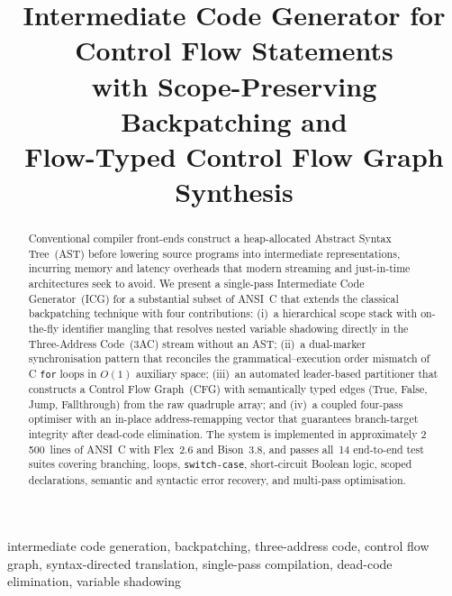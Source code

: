 \documentclass[conference]{IEEEtran}
\begin{document}
\title{Intermediate Code Generator for Control Flow Statements\\with Scope-Preserving Backpatching and\\Flow-Typed Control Flow Graph Synthesis}

\author{
\and
{}
\and
{}
}

\maketitle

\begin{abstract}
Conventional compiler front-ends construct a heap-allocated Abstract Syntax Tree~(AST) before lowering source programs into intermediate representations, incurring memory and latency overheads that modern streaming and just-in-time architectures seek to avoid. We present a single-pass Intermediate Code Generator~(ICG) for a substantial subset of ANSI~C that extends the classical backpatching technique with four contributions: (i)~a hierarchical scope stack with on-the-fly identifier mangling that resolves nested variable shadowing directly in the Three-Address Code~(3AC) stream without an AST; (ii)~a dual-marker synchronisation pattern that reconciles the grammatical--execution order mismatch of C \texttt{for} loops in $O(1)$ auxiliary space; (iii)~an automated leader-based partitioner that constructs a Control Flow Graph~(CFG) with semantically typed edges (True, False, Jump, Fallthrough) from the raw quadruple array; and (iv)~a coupled four-pass optimiser with an in-place address-remapping vector that guarantees branch-target integrity after dead-code elimination. The system is implemented in approximately 2\,500~lines of ANSI~C with Flex~2.6 and Bison~3.8, and passes all~14 end-to-end test suites covering branching, loops, \texttt{switch-case}, short-circuit Boolean logic, scoped declarations, semantic and syntactic error recovery, and multi-pass optimisation.
\end{abstract}

\begin{IEEEkeywords}
intermediate code generation, backpatching, three-address code, control flow graph, syntax-directed translation, single-pass compilation, dead-code elimination, variable shadowing
\end{IEEEkeywords}
\end{document}
